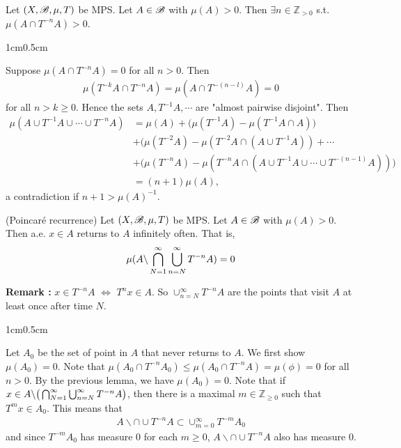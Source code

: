 \documentclass[10pt,a4paper]{report}
\newenvironment{proof}
{\begin{changemargin}{1cm}{0.5cm} 
	}%
	{\end{changemargin}
}
\begin{document}
\lem Let $(X, \mathscr{B}, \mu, T)$ be MPS. Let $A\in \mathscr{B}$ with $\mu(A) >0$. Then $\exists n \in \mathbb{Z}_{>0}$ s.t. $\mu(A \cap T^{-n}A) >0$.
\begin{proof}
\pf Suppose $\mu(A \cap T^{-n}A) =0$ for all $n>0$. Then
\begin{align*}
\mu(T^{-k}A\cap T^{-n}A) = \mu(A \cap T^{-(n-l)}A ) =0
\end{align*}
for all $n>k\geq 0$. Hence the sets $A, T^{-1}A,\cdots$ are "almost pairwise disjoint". Then
\begin{align*}
\mu(A \cup T^{-1}A \cup \cdots \cup T^{-n}A) &= \mu(A) + \big( \mu(T^{-1}A) - \mu(T^{-1}A \cap A) \big)\\
& + \big( \mu(T^{-2}A) - \mu(T^{-2}A \cap (A \cup T^{-1}A)) + \cdots \\
& + \big( \mu(T^{-n}A) - \mu(T^{-n}A \cap (A \cup T^{-1}A \cup \cdots \cup T^{-(n-1)}A) ) \big) \\
& = (n+1) \mu(A),
\end{align*}
a contradiction if $n+1 > \mu(A)^{-1}$.

\eop
\end{proof}
\s

\thm (Poincar\'{e} recurrence) Let $(X,\mathscr{B}, \mu, T)$ be MPS. Let $A \in \mathscr{B}$ with $\mu(A) >0$. Then a.e. $x\in A$ returns to $A$ infinitely often. That is,
\begin{align*}
\mu(A \backslash \bigcap_{N=1}^{\infty}\bigcup_{n=N}^{\infty} T^{-n} A  ) =0
\end{align*}
\s

\textbf{Remark : } $x\in T^{-n} A$ $\Leftrightarrow$ $T^{n}x \in A$. So $\cup_{n=N}^{\infty} T^{-n}A$ are the points that visit $A$ at least once after time $N$. 
\s

\begin{proof}
\pf Let $A_0$ be the set of point in $A$ that never returns to $A$. We first show $\mu(A_0)=0$. Note that $\mu(A_0 \cap T^{-n}A_0) \leq \mu(A_0 \cap T^{-n}A) = \mu(\phi) =0$ for all $n>0$. By the previous lemma, we have $\mu(A_0) =0$. Note that if $x\in A \backslash \big( \bigcap_{N=1}^{\infty}\bigcup_{n=N}^{\infty} T^{-n} A \big)$, then there is a maximal $m\in \mathbb{Z}_{\geq 0}$ such that $T^{m}x \in A_0$. This means that
\begin{align*}
A \backslash \cap \cup T^{-n} A \subset \cup_{m=0}^{\infty}T^{-m}A_0
\end{align*}
and since $T^{-m} A_0$ has measure 0 for each $m\geq 0$, $A \backslash \cap \cup T^{-n} A$ also has measure 0.

\eop
\end{proof}
\s
\end{document}

